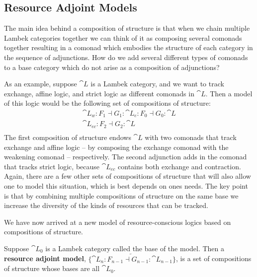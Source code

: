 \subsection{Resource Adjoint Models}
\label{subsec:resource_adjoint_models}

The main idea behind a composition of structure is that when we
chain multiple Lambek categories together we can think of it as
composing several comonads together resulting in a comonad which
embodies the structure of each category in the sequence of
adjunctions.  How do we add several different types of
comonads to a base category which do not arise as a composition of
adjunctions?

As an example, suppose $\cat{L}$ is a Lambek category, and we want to
track exchange, affine logic, and strict logic as different comonads
in $\cat{L}$.  Then a model of this logic would be the following set
of compositions of structure:
\[
\begin{array}{lll}
  \cat{L}_w : F_1 \dashv G_1 : \cat{L}_e : F_0 \dashv G_0 : \cat{L}\\
  \cat{L}_{ec} : F_2 \dashv G_2 : \cat{L}\\
\end{array}
\]
The first composition of structure endows $\cat{L}$ with two comonads
that track exchange and affine logic -- by composing the exchange
comonad with the weakening comonad -- respectively.  The second
adjunction adds in the comonad that tracks strict logic, because
$\cat{L}_{ec}$ contains both exchange and contraction.  Again, there
are a few other sets of compositions of structure that will also allow
one to model this situation, which is best depends on ones needs.  The
key point is that by combining multiple compositions of structure on
the same base we increase the diversity of the kinds of resources that
can be tracked.

We have now arrived at a new model of resource-conscious logics based
on compositions of structure.
\begin{definition}
  \label{def:resource-adjoint-model}
  Suppose $\cat{L}_0$ is a Lambek category called the base of the
  model.  Then a \textbf{resource adjoint model},
  $\{\overleftarrow{\cat{L}_n : F_{n-1} \dashv G_{n-1} : \cat{L}_{n-1}}\}$,
  is a set of compositions of structure whose bases are all $\cat{L}_0$.
\end{definition}



